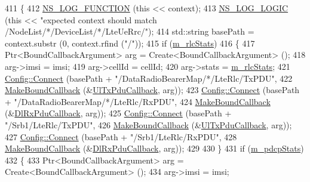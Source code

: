 \begin{DoxyCode}
411 \{
412   \hyperlink{log-macros-disabled_8h_a90b90d5bad1f39cb1b64923ea94c0761}{NS\_LOG\_FUNCTION} (\textcolor{keyword}{this} << context);
413   \hyperlink{group__logging_ga88acd260151caf2db9c0fc84997f45ce}{NS\_LOG\_LOGIC} (\textcolor{keyword}{this} << \textcolor{stringliteral}{"expected context should match /NodeList/*/DeviceList/*/LteUeRrc/"});
414   std::string basePath = context.substr (0, context.rfind (\textcolor{stringliteral}{"/"}));
415   \textcolor{keywordflow}{if} (\hyperlink{classns3_1_1RadioBearerStatsConnector_a25b5370b25e598c40f5d40d845ca072b}{m\_rlcStats})
416     \{
417       Ptr<BoundCallbackArgument> arg = Create<BoundCallbackArgument> ();
418       arg->imsi = imsi;
419       arg->cellId = cellId; 
420       arg->stats = \hyperlink{classns3_1_1RadioBearerStatsConnector_a25b5370b25e598c40f5d40d845ca072b}{m\_rlcStats};
421       \hyperlink{group__config_ga4014f151241cd0939b6cb64409605736}{Config::Connect} (basePath + \textcolor{stringliteral}{"/DataRadioBearerMap/*/LteRlc/TxPDU"},
422                        \hyperlink{group__makeboundcallback_ga1725d6362e6065faa0709f7c93f8d770}{MakeBoundCallback} (&\hyperlink{namespacens3_ae624428f0992ac62a3c5f2e7318fb98e}{UlTxPduCallback}, arg));
423       \hyperlink{group__config_ga4014f151241cd0939b6cb64409605736}{Config::Connect} (basePath + \textcolor{stringliteral}{"/DataRadioBearerMap/*/LteRlc/RxPDU"},
424                        \hyperlink{group__makeboundcallback_ga1725d6362e6065faa0709f7c93f8d770}{MakeBoundCallback} (&\hyperlink{namespacens3_ae4fb5123d8a56fce742428b530ec4197}{DlRxPduCallback}, arg));
425       \hyperlink{group__config_ga4014f151241cd0939b6cb64409605736}{Config::Connect} (basePath + \textcolor{stringliteral}{"/Srb1/LteRlc/TxPDU"},
426                        \hyperlink{group__makeboundcallback_ga1725d6362e6065faa0709f7c93f8d770}{MakeBoundCallback} (&\hyperlink{namespacens3_ae624428f0992ac62a3c5f2e7318fb98e}{UlTxPduCallback}, arg));
427       \hyperlink{group__config_ga4014f151241cd0939b6cb64409605736}{Config::Connect} (basePath + \textcolor{stringliteral}{"/Srb1/LteRlc/RxPDU"},
428                        \hyperlink{group__makeboundcallback_ga1725d6362e6065faa0709f7c93f8d770}{MakeBoundCallback} (&\hyperlink{namespacens3_ae4fb5123d8a56fce742428b530ec4197}{DlRxPduCallback}, arg));
429 
430     \}
431   \textcolor{keywordflow}{if} (\hyperlink{classns3_1_1RadioBearerStatsConnector_a984690769317e9eddba15e49170f10d9}{m\_pdcpStats})
432     \{
433       Ptr<BoundCallbackArgument> arg = Create<BoundCallbackArgument> ();
434       arg->imsi = imsi;

\end{DoxyCode}
